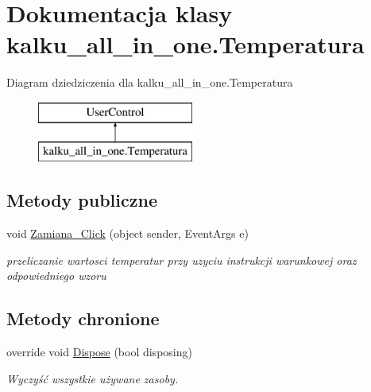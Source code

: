 \hypertarget{classkalku__all__in__one_1_1_temperatura}{}\section{Dokumentacja klasy kalku\+\_\+all\+\_\+in\+\_\+one.\+Temperatura}
\label{classkalku__all__in__one_1_1_temperatura}
Diagram dziedziczenia dla kalku\+\_\+all\+\_\+in\+\_\+one.\+Temperatura\begin{figure}[H]
\begin{center}
\leavevmode
\includegraphics[height=2.000000cm]{classkalku__all__in__one_1_1_temperatura}
\end{center}
\end{figure}
\subsection*{Metody publiczne}
\begin{DoxyCompactItemize}
\item 
\mbox{\label{classkalku__all__in__one_1_1_temperatura_a1d656f99f872a7073fcb47a0fff39b30}} 
void \mbox{\hyperlink{classkalku__all__in__one_1_1_temperatura_a1d656f99f872a7073fcb47a0fff39b30}{Zamiana\+\_\+\+Click}} (object sender, Event\+Args e)
\begin{DoxyCompactList}\small\item\em przeliczanie wartosci temperatur przy uzyciu instrukcji warunkowej oraz odpowiedniego wzoru \end{DoxyCompactList}\end{DoxyCompactItemize}
\subsection*{Metody chronione}
\begin{DoxyCompactItemize}
\item 
override void \mbox{\hyperlink{classkalku__all__in__one_1_1_temperatura_a8ee164b12547a890766e4a7c5f32c956}{Dispose}} (bool disposing)
\begin{DoxyCompactList}\small\item\em Wyczyść wszystkie używane zasoby. \end{DoxyCompactList}\end{DoxyCompactItemize}
